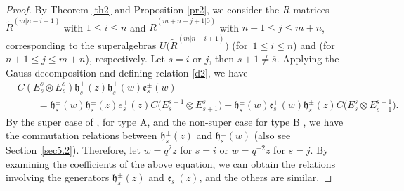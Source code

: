 \documentclass[pdftex]{sigma}
\numberwithin{equation}{section}
\begin{document}
\begin{proof}
By Theorem \ref{th2} and Proposition \ref{pr2}, we consider the $R$-matrices $\widetilde{R}^{(m|n-i+1)}$ with $1\leq i\leq n$ and $\widetilde{R}^{(m+n-j+1|0)}$ with $n+1\leq j\leq m+n$, corresponding to the superalgebras $U\bigl(\widetilde{R}^{(m|n-i+1)}\bigr)$ (for~${1\leq i\leq n}$) and  (for $n+1\leq j\leq m+n$), respectively. Let $s=i$ or $j$, then $s+1\neq \overline{s}$. Applying the Gauss decomposition and defining relation \eqref{d2}, we have
\begin{align*}
 & C(E^s_s\otimes E^s_s) \mathfrak{h}_s^{\pm}(z)\mathfrak{h}_s^{\pm}(w)\mathfrak{e}_s^{\pm}(w)\\
 &\qquad =\mathfrak{h}_s^{\pm}(w)
 \mathfrak{h}_s^{\pm}(z)e_s^{\pm}(z)C\bigl(E^{s+1}_s\otimes E^s_{s+1}\bigr) + \mathfrak{h}_s^{\pm}(w)\mathfrak{e}_s^{\pm}(w)\mathfrak{h}_s^{\pm}(z)C\bigl(E^s_s\otimes E^{s+1}_{s+1}\bigr).
\end{align*}
By the super case of \cite[relations (33)--(34)]{JSKW}, \cite[Definition~2]{HBKD} for type A, and the non-super case for type B \cite[Theorem 4.29]{JMAB}, we have the commutation relations between $\mathfrak{h}_s^{\pm}(z)$ and $\mathfrak{h}_s^{\pm}(w)$ (also see Section~\ref{sec5.2}). Therefore, let $w=q^{2}z$ for $s=i$ or $w=q^{-2}z$ for $s=j$. By examining the coefficients of the above equation, we can obtain the relations involving the generators $\mathfrak{h}_s^{\pm}(z)$ and $\mathfrak{e}_s^{\pm}(z)$, and the others are similar.
\end{proof}
\end{document}
